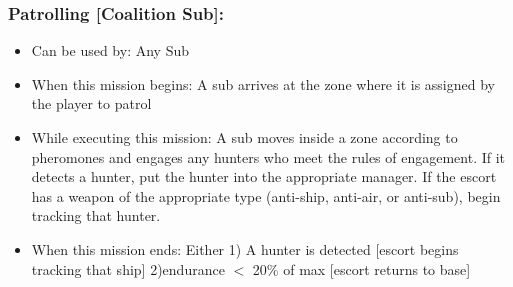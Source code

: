 \documentclass{article}
\begin{document}
    \subsubsection{Patrolling [Coalition Sub]:}
        \begin{itemize}
            \item{Can be used by:} Any Sub
            \item{When this mission begins:} A sub arrives at the zone where it is assigned by the player to patrol
            \item{While executing this mission:} A sub moves inside a zone according to pheromones and engages any hunters who meet the rules of engagement. If it detects a hunter, put the hunter into the appropriate manager. If the escort has a weapon of the appropriate type (anti-ship, anti-air, or anti-sub), begin tracking that hunter.
            \item{When this mission ends:} Either 1) A hunter is detected [escort begins tracking that ship] 2)endurance $<$ 20\% of max [escort returns to base]
        \end{itemize}
\end{document}
